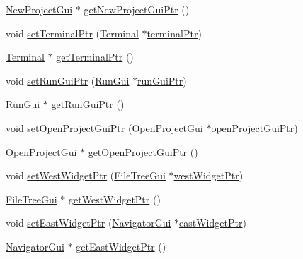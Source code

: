 \begin{DoxyCompactItemize}
\item 
\hyperlink{class_new_project_gui}{New\-Project\-Gui} $\ast$ \hyperlink{class_master_actions_a30b51649f46b8f105f8be5d9b4a6fb5f}{get\-New\-Project\-Gui\-Ptr} ()
\item 
void \hyperlink{class_master_actions_a9a65dcf1c8e292712de196eabbaa9952}{set\-Terminal\-Ptr} (\hyperlink{class_terminal}{Terminal} $\ast$\hyperlink{class_master_actions_accb886e749ad46cb6373187e59921bcf}{terminal\-Ptr})
\item 
\hyperlink{class_terminal}{Terminal} $\ast$ \hyperlink{class_master_actions_aed6c3f33a2f6f7a97d2006299d861269}{get\-Terminal\-Ptr} ()
\item 
void \hyperlink{class_master_actions_a67bf77b969dcbe752434110c8163d792}{set\-Run\-Gui\-Ptr} (\hyperlink{class_run_gui}{Run\-Gui} $\ast$\hyperlink{class_master_actions_ad7ff295f2e3067697e290afc4f0fd0df}{run\-Gui\-Ptr})
\item 
\hyperlink{class_run_gui}{Run\-Gui} $\ast$ \hyperlink{class_master_actions_a056278722ed1dbe98df15d1d073454bc}{get\-Run\-Gui\-Ptr} ()
\item 
void \hyperlink{class_master_actions_afc72dd08b2b6c8c25b8c4650b0446172}{set\-Open\-Project\-Gui\-Ptr} (\hyperlink{class_open_project_gui}{Open\-Project\-Gui} $\ast$\hyperlink{class_master_actions_a6caf7325dd9cb26f72c81a8c877db634}{open\-Project\-Gui\-Ptr})
\item 
\hyperlink{class_open_project_gui}{Open\-Project\-Gui} $\ast$ \hyperlink{class_master_actions_ab70b9336f1785ba7759b393d0b6a41db}{get\-Open\-Project\-Gui\-Ptr} ()
\item 
void \hyperlink{class_master_actions_a5e02bad0c35da48dcf7dc6a104d4a745}{set\-West\-Widget\-Ptr} (\hyperlink{class_file_tree_gui}{File\-Tree\-Gui} $\ast$\hyperlink{class_master_actions_a84f8a14213e1f05a00f1855b41a973de}{west\-Widget\-Ptr})
\item 
\hyperlink{class_file_tree_gui}{File\-Tree\-Gui} $\ast$ \hyperlink{class_master_actions_aae29be0bf5f9f2b8f1c7aac0c7efb288}{get\-West\-Widget\-Ptr} ()
\item 
void \hyperlink{class_master_actions_a983ce09c5c21c3cbf912472e878c7842}{set\-East\-Widget\-Ptr} (\hyperlink{class_navigator_gui}{Navigator\-Gui} $\ast$\hyperlink{class_master_actions_a24c61c608d67e766f996d3a430a7bae0}{east\-Widget\-Ptr})
\item 
\hyperlink{class_navigator_gui}{Navigator\-Gui} $\ast$ \hyperlink{class_master_actions_a863ab54858bacd76b50af788a6846e8e}{get\-East\-Widget\-Ptr} ()
\item 

\end{DoxyCompactItemize}
